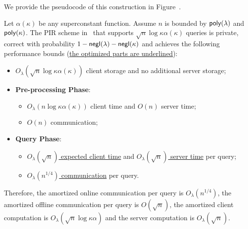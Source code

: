 We provide the pseudocode of this construction in
Figure~.

\begin{theorem}
    \label{thm:main2}
    Let $\alpha(\kappa)$ be any superconstant function. Assume $n$ is bounded by
    $\mathsf{poly}(\lambda)$ and $\mathsf{poly}(\kappa)$. The PIR scheme
    in~ that supports $\sqrt{n}\log \kappa \alpha(\kappa)$ queries is
    private, correct with probability $1-\mathsf{negl}(\lambda)-\mathsf{negl}(\kappa)$ and
    achieves the following performance bounds (\underline{the optimized parts
    are underlined}):
    \begin{itemize}
        \item $O_\lambda(\sqrt{n}\log \kappa \alpha(\kappa))$ client storage and
        no additional server storage;
        \item \textbf{Pre-processing Phase}:
        \begin{itemize}
            \item $O_\lambda(n\log \kappa \alpha(\kappa))$ client time and
            $O(n)$ server time;
            \item $O(n)$ communication;
        \end{itemize}
        \item \textbf{Query Phase}:
        \begin{itemize}
            \item \underline{$O_\lambda(\sqrt{n})$ expected client time} and
            \underline{$O_\lambda(\sqrt{n})$ server time} per query; 
            \item \underline{$O_\lambda(n^{1/4})$ communication} per query.
        \end{itemize}
    \end{itemize} 
    
    Therefore, the amortized online communication per query is $O_\lambda(n^{1/4})$, the amortized offline communication per query is $O(\sqrt{n})$, the amortized client computation is $O_\lambda(\sqrt{n}\log \kappa \alpha)$ and the server computation is $O_\lambda(\sqrt{n})$.
\end{theorem}

